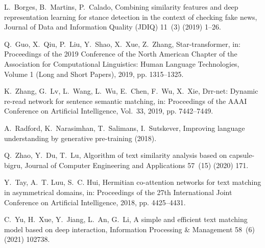 \documentclass[review]{elsarticle}
\begin{document}
\begin{thebibliography}{10}
L.~Borges, B.~Martins, P.~Calado, Combining similarity features and deep
  representation learning for stance detection in the context of checking fake
  news, Journal of Data and Information Quality (JDIQ) 11~(3) (2019) 1--26.

Q.~Guo, X.~Qiu, P.~Liu, Y.~Shao, X.~Xue, Z.~Zhang, Star-transformer, in:
  Proceedings of the 2019 Conference of the North American Chapter of the
  Association for Computational Linguistics: Human Language Technologies,
  Volume 1 (Long and Short Papers), 2019, pp. 1315--1325.

K.~Zhang, G.~Lv, L.~Wang, L.~Wu, E.~Chen, F.~Wu, X.~Xie, Drr-net: Dynamic
  re-read network for sentence semantic matching, in: Proceedings of the AAAI
  Conference on Artificial Intelligence, Vol.~33, 2019, pp. 7442--7449.

A.~Radford, K.~Narasimhan, T.~Salimans, I.~Sutskever, Improving language
  understanding by generative pre-training (2018).

Q.~Zhao, Y.~Du, T.~Lu, Algorithm of text similarity analysis based on
  capsule-bigru, Journal of Computer Engineering and Applications 57~(15)
  (2020) 171.

Y.~Tay, A.~T. Luu, S.~C. Hui, Hermitian co-attention networks for text matching
  in asymmetrical domains, in: Proceedings of the 27th International Joint
  Conference on Artificial Intelligence, 2018, pp. 4425--4431.

C.~Yu, H.~Xue, Y.~Jiang, L.~An, G.~Li, A simple and efficient text matching
  model based on deep interaction, Information Processing \& Management 58~(6)
  (2021) 102738.

\end{thebibliography}
 
\end{document}
